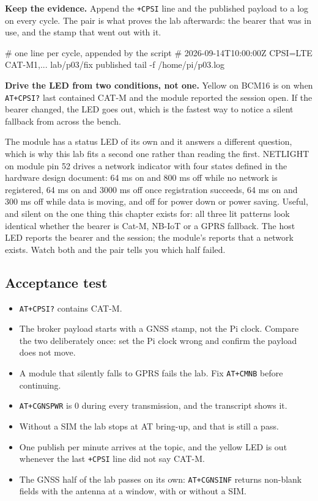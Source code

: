 \begin{steps}
\item \textbf{Keep the evidence.} Append the \texttt{+CPSI} line and the published payload to a log on every cycle. The pair is what proves the lab afterwards: the bearer that was in use, and the stamp that went out with it.
\begin{shellcode}
# one line per cycle, appended by the script
# 2026-09-14T10:00:00Z  CPSI=LTE CAT-M1,...  lab/p03/fix  published
tail -f /home/pi/p03.log
\end{shellcode}

\item \textbf{Drive the LED from two conditions, not one.} Yellow on BCM16 is on when \texttt{AT+CPSI?} last contained CAT-M and the module reported the session open. If the bearer changed, the LED goes out, which is the fastest way to notice a silent fallback from across the bench.

The module has a status LED of its own and it answers a different question, which is why this lab fits a second one rather than reading the first. NETLIGHT on module pin 52 drives a network indicator with four states defined in the hardware design document: 64 ms on and 800 ms off while no network is registered, 64 ms on and 3000 ms off once registration succeeds, 64 ms on and 300 ms off while data is moving, and off for power down or power saving. Useful, and silent on the one thing this chapter exists for: all three lit patterns look identical whether the bearer is Cat-M, NB-IoT or a GPRS fallback. The host LED reports the bearer and the session; the module's reports that a network exists. Watch both and the pair tells you which half failed.
\end{steps}

\subsection*{Acceptance test}

\begin{itemize}
\item \texttt{AT+CPSI?} contains CAT-M.
\item The broker payload starts with a GNSS stamp, not the Pi clock. Compare the two deliberately once: set the Pi clock wrong and confirm the payload does not move.
\item A module that silently falls to GPRS fails the lab. Fix \texttt{AT+CMNB} before continuing.
\item \texttt{AT+CGNSPWR} is 0 during every transmission, and the transcript shows it.
\item Without a SIM the lab stops at AT bring-up, and that is still a pass.
\item One publish per minute arrives at the topic, and the yellow LED is out whenever the last \texttt{+CPSI} line did not say CAT-M.
\item The GNSS half of the lab passes on its own: \texttt{AT+CGNSINF} returns non-blank fields with the antenna at a window, with or without a SIM.
\end{itemize}

